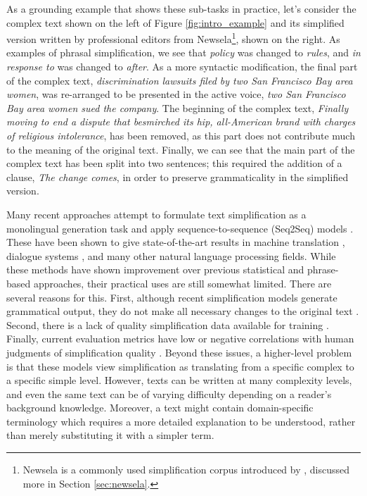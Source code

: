 \documentclass[thesis.tex]{subfiles}
\begin{document}
As a grounding example that shows these sub-tasks in practice, let's consider the complex text shown on the left of Figure \ref{fig:intro_example} and its simplified version written by professional editors from Newsela\footnote{Newsela is a commonly used simplification corpus introduced by \cite{xu2015problems}, discussed more in Section \ref{sec:newsela}.}, shown on the right. As examples of phrasal simplification, we see that \textit{policy} was changed to \textit{rules}, and \textit{in response to} was changed to \textit{after}. As a more syntactic modification, the final part of the complex text, \textit{discrimination lawsuits filed by two San Francisco Bay area women}, was re-arranged to be presented in the active voice, \textit{two San Francisco Bay area women sued the company}. The beginning of the complex text, \textit{Finally moving to end a dispute that besmirched its hip, all-American brand with charges of religious intolerance}, has been removed, as this part does not contribute much to the meaning of the original text. Finally, we can see that the main part of the complex text has been split into two sentences; this required the addition of a clause, \textit{The change comes}, in order to preserve grammaticality in the simplified version.

Many recent approaches attempt to formulate text simplification as a monolingual generation task and apply sequence-to-sequence (Seq2Seq) models \citep{nisioi2017exploring,zhang2017sentence,zhao2018integrating}. These have been shown to give state-of-the-art results in machine translation \citep{sutskever2014sequence}, dialogue systems \citep{vinyals2015neural}, and many other natural language processing fields. While these methods have shown improvement over previous statistical and phrase-based approaches, their practical uses are still somewhat limited. There are several reasons for this. First, although recent simplification models generate grammatical output, they do not make all necessary changes to the original text \citep{zhang2017sentence}. Second, there is a lack of quality simplification data available for training \citep{xu2015problems}. Finally, current evaluation metrics have low or negative correlations with human judgments of simplification quality \citep{xu2016optimizing,sulem2018bleu}. Beyond these issues, a higher-level problem is that these models view simplification as translating from a specific complex to a specific simple level. However, texts can be written at many complexity levels, and even the same text can be of varying difficulty depending on a reader's background knowledge. Moreover, a text might contain domain-specific terminology which requires a more detailed explanation to be understood, rather than merely substituting it with a simpler term.
\end{document}

